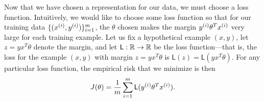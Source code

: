 \documentclass{article}
\newcommand{\loss}{\mathsf{L}}
\begin{document}
Now that we have chosen a representation for our data, we must choose a loss
function. Intuitively, we would like to choose some loss function so that
for our training data $\{({x^{(i)}}, {y^{(i)}})\}_{i = 1}^m$, the $\theta$ chosen
makes the margin ${y^{(i)}} \theta^T {x^{(i)}}$ very large for each training example.
Let us fix a hypothetical example $(x, y)$, let $z = y x^T \theta$ denote
the margin, and let $\loss : \R \to \R$ be the loss function---that is,
the loss for the example $(x, y)$ with margin $z = y x^T \theta$ is
$\loss(z) = \loss(y x^T \theta)$.
For any particular loss function, the empirical risk that we minimize
is then
\begin{equation}
  J(\theta)
  = \frac{1}{m} \sum_{i = 1}^m \loss(\ysi \theta^T \xsi).
\end{equation}

\newcommand{\zoloss}{\loss_{\rm zo}}
\newcommand{\logloss}{\loss_{\rm logistic}}
\newcommand{\hingeloss}{\loss_{\rm hinge}}
\newcommand{\exploss}{\loss_{\rm exp}}
\newcommand{\hinge}[1]{\left[{#1}\right]_+}
\end{document}
